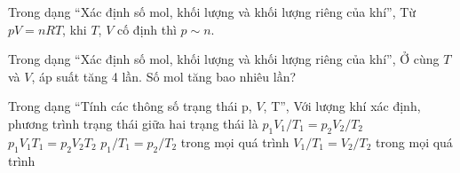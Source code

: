 \begin{ex}
Trong dạng “Xác định số mol, khối lượng và khối lượng riêng của khí”, Từ $pV=nRT$, khi $T$, $V$ cố định thì $p\sim n$.
\choiceTF

\end{ex}

\begin{ex}
Trong dạng “Xác định số mol, khối lượng và khối lượng riêng của khí”, Ở cùng $T$ và $V$, áp suất tăng 4 lần. Số mol tăng bao nhiêu lần?
\end{ex}

\begin{ex}
Trong dạng “Tính các thông số trạng thái p, $V$, T”, Với lượng khí xác định, phương trình trạng thái giữa hai trạng thái là
\choice
{\True $p_1V_1/T_1=p_2V_2/T_2$}
{$p_1V_1T_1=p_2V_2T_2$}
{$p_1/T_1=p_2/T_2$ trong mọi quá trình}
{$V_1/T_1=V_2/T_2$ trong mọi quá trình}
\end{ex}


